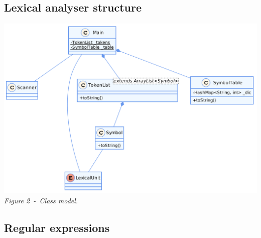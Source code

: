 \documentclass[a4paper,11pt]{article}
\begin{document}
  \subsection{Lexical analyser structure}
    \begin{center}
      \includegraphics[scale=0.35]{./img/class_diag.png}\\
      \textit{Figure 2~-~Class model.}
    \end{center}
  
  \subsection{Regular expressions}
\end{document}
